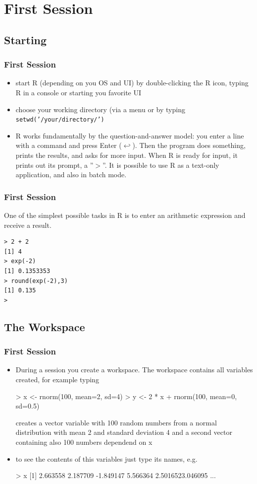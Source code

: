 \documentclass[xcolor={table},c]{beamer}
\begin{document}
\section{First Session}
\subsection{Starting}
\begin{frame}[allowframebreaks]\frametitle{First Session}
\begin{itemize}
\item start R (depending on you OS and UI) by double-clicking the R icon, typing R in a console or starting you favorite UI
\item choose your working directory (via a menu or by typing \texttt{setwd('/your/directory/')}
\item R works fundamentally by the question-and-answer model: you enter a line with a command and
press Enter ($\hookleftarrow$). Then the program does something, prints the results, and asks for
more input. When R  is ready for input, it prints out its prompt, a ''$>$''. It is possible to use
R as a text-only application, and also in batch mode.
\end{itemize}
\end{frame}

\begin{frame}[fragile]\frametitle{First Session}
One of the simplest possible tasks in R is to enter an arithmetic expression and receive a result.
\begin{verbatim}
> 2 + 2
[1] 4
> exp(-2)
[1] 0.1353353
> round(exp(-2),3)
[1] 0.135
>
\end{verbatim}
\end{frame}

\subsection{The Workspace}
\begin{frame}[fragile]\frametitle{First Session}
\begin{itemize}
\item During a session you create a workspace. The workspace contains all variables created,
for example typing
\begin{semiverbatim}
> x <- rnorm(100, mean=2, sd=4)
> y <- 2 * x  + rnorm(100, mean=0, sd=0.5)
\end{semiverbatim}
creates a vector variable with 100 random numbers from a normal distribution with mean 2 and standard deviation 4 and a second vector containing also 100 numbers dependend on x
\item to see the contents of this variables just type its names, e.g.
\small
\begin{semiverbatim}
> x
 [1]  2.663558 2.187709 -1.849147 
            5.566364 2.5016523.046095  ...
\end{semiverbatim}
\end{itemize}
\end{frame}
\end{document}
